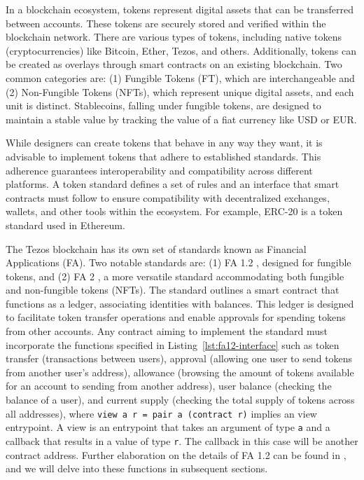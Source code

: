 \documentclass[a4paper,USenglish,cleveref, autoref, thm-restate]{lipics-v2021}
\begin{document}
In a blockchain ecosystem, tokens represent digital assets that can be
transferred between accounts. These tokens are securely stored and
verified within the blockchain network. There are various types of
tokens, including native tokens (cryptocurrencies) like Bitcoin,
Ether, Tezos, and others. Additionally, tokens can be created as
overlays through smart contracts on an existing blockchain. Two common
categories are: (1) Fungible Tokens (FT), which are interchangeable
and (2) Non-Fungible Tokens (NFTs), which represent unique digital
assets, and each unit is distinct. Stablecoins, falling under fungible
tokens, are designed to maintain a stable value by tracking the value
of a fiat currency like USD or EUR.

While designers can create tokens that behave in any way they want, it
is advisable to implement tokens that adhere to established standards.
This adherence guarantees interoperability and compatibility across
different platforms. A token standard defines a set of rules and an
interface that smart contracts must follow to ensure compatibility
with decentralized exchanges, wallets, and other tools within the
ecosystem. For example, ERC-20 \cite{erc} is a token standard used in Ethereum.  


The Tezos blockchain has its own set of standards known as Financial
Applications (FA). Two notable standards are: (1) FA 1.2 \cite{fatzip}, designed for
fungible tokens, and (2) FA 2 \cite{fatzips}, a more versatile standard accommodating
both fungible and non-fungible tokens (NFTs). The standard outlines a
smart contract that functions as a ledger, associating identities with
balances. This ledger is designed to facilitate token transfer
operations and enable approvals for spending tokens from other
accounts. Any contract aiming to implement the standard must
incorporate the functions specified in
Listing~\ref{lst:fa12-interface} such as token transfer (transactions
between users), approval (allowing one user to send tokens from
another user's address),  allowance (browsing the amount of tokens
available for an account to sending from another address), user
balance (checking the balance of a user), and current supply (checking
the total supply of tokens across all addresses), where
\lstinline/view a r = pair a (contract r)/ implies an view entrypoint.
A view is an entrypoint that takes an
argument of type \lstinline/a/ and a callback that results in a value
of type \lstinline/r/. The callback in this case will be another
contract address. Further elaboration on the details of FA 1.2 can be
found in \cite{usdtz}, and we will delve into
these functions in subsequent 
sections.
\end{document}
